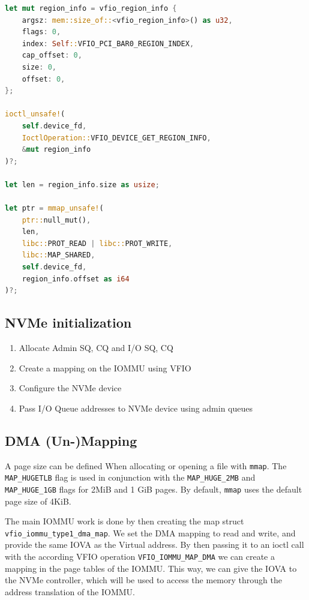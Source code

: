 \begin{minipage}{.95\linewidth}
    \begin{lstlisting}[language=Rust,caption={Mapping the BAR0 NVMe register to memory}, label=lst:bar0map]
let mut region_info = vfio_region_info {
    argsz: mem::size_of::<vfio_region_info>() as u32,
    flags: 0,
    index: Self::VFIO_PCI_BAR0_REGION_INDEX,
    cap_offset: 0,
    size: 0,
    offset: 0,
};

ioctl_unsafe!(
    self.device_fd,
    IoctlOperation::VFIO_DEVICE_GET_REGION_INFO,
    &mut region_info
)?;

let len = region_info.size as usize;

let ptr = mmap_unsafe!(
    ptr::null_mut(),
    len,
    libc::PROT_READ | libc::PROT_WRITE,
    libc::MAP_SHARED,
    self.device_fd,
    region_info.offset as i64
)?; 
\end{lstlisting}
\end{minipage}

\subsection{NVMe initialization}\label{sec:nvmeinit}


\begin{enumerate}
    \item Allocate Admin SQ, CQ and I/O SQ, CQ
    \item Create a mapping on the IOMMU using VFIO
    \item Configure the NVMe device
    \item Pass I/O Queue addresses to NVMe device using admin queues
\end{enumerate}

\subsection{DMA (Un-)Mapping}\label{sec:dmamapping}
A page size can be defined When allocating or opening a file with \texttt{mmap}. The \texttt{MAP\_HUGETLB} flag is used in conjunction with the \texttt{MAP\_HUGE\_2MB} and \texttt{MAP\_HUGE\_1GB} flags for 2MiB and 1 GiB pages. By default, \texttt{mmap} uses the default page size of 4KiB.

The main IOMMU work is done by then creating the map struct \texttt{vfio\_iommu\_type1\_dma\_map}. We set the DMA mapping to read and write, and provide the same IOVA as the Virtual address. By then passing it to an ioctl call with the according VFIO operation \texttt{VFIO\_IOMMU\_MAP\_DMA} we can create a mapping in the page tables of the IOMMU. This way, we can give the IOVA to the NVMe controller, which will be used to access the memory through the address translation of the IOMMU.

